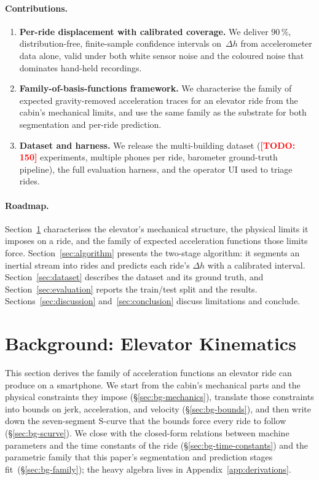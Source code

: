 \documentclass[manuscript,review,screen]{acmart}
\newcommand{\todo}[1]{\textcolor{red}{\textbf{[TODO: #1]}}}
\begin{document}
\paragraph{Contributions.}
\begin{enumerate}
  \item \textbf{Per-ride displacement with calibrated coverage.}
    We deliver $90\,\%$, distribution-free, finite-sample confidence
    intervals on~$\Delta h$ from accelerometer data alone, valid
    under both white sensor noise and the coloured noise that
    dominates hand-held recordings.
  \item \textbf{Family-of-basis-functions framework.} We
    characterise the family of expected gravity-removed acceleration
    traces for an elevator ride from the cabin's mechanical limits,
    and use the same family as the substrate for both segmentation
    and per-ride prediction.
  \item \textbf{Dataset and harness.} We release the multi-building
    dataset (\todo{150} experiments, multiple phones per ride,
    barometer ground-truth pipeline), the full evaluation harness,
    and the operator UI used to triage rides.
\end{enumerate}

\paragraph{Roadmap.}
Section~\ref{sec:background} characterises the elevator's mechanical
structure, the physical limits it imposes on a ride, and the family
of expected acceleration functions those limits force.
Section~\ref{sec:algorithm} presents the two-stage algorithm: it
segments an inertial stream into rides and predicts each ride's
$\Delta h$ with a calibrated interval.  Section~\ref{sec:dataset}
describes the dataset and its ground truth, and
Section~\ref{sec:evaluation} reports the train/test split and the
results.  Sections~\ref{sec:discussion} and~\ref{sec:conclusion}
discuss limitations and conclude.

\section{Background: Elevator Kinematics}
\label{sec:background}

This section derives the family of acceleration functions an elevator
ride can produce on a smartphone.  We start from the cabin's mechanical
parts and the physical constraints they impose
(\S\ref{sec:bg-mechanics}), translate those constraints into bounds on
jerk, acceleration, and velocity (\S\ref{sec:bg-bounds}), and then
write down the seven-segment S-curve that the bounds force every ride
to follow (\S\ref{sec:bg-scurve}).  We close with the closed-form
relations between machine parameters and the time constants of the
ride (\S\ref{sec:bg-time-constants}) and the parametric family that
this paper's segmentation and prediction stages
fit~(\S\ref{sec:bg-family}); the heavy algebra lives in
Appendix~\ref{app:derivations}.
\end{document}
